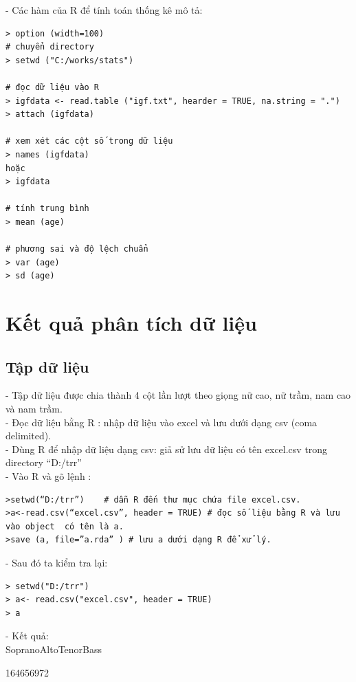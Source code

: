 \documentclass[a4paper]{article}
\begin{document}
		- Các hàm của R để tính toán thống kê mô tả:
\begin{verbatim}
> option (width=100)
# chuyển directory
> setwd ("C:/works/stats")

# đọc dữ liệu vào R
> igfdata <- read.table ("igf.txt", hearder = TRUE, na.string = ".")
> attach (igfdata)

# xem xét các cột số trong dữ liệu
> names (igfdata)
hoặc
> igfdata

# tính trung bình
> mean (age)

# phương sai và độ lệch chuẩn
> var (age)
> sd (age)
\end{verbatim}

\section{Kết quả phân tích dữ liệu}
	\subsection{Tập dữ liệu} 
- Tập dữ liệu được chia thành 4 cột lần lượt theo giọng nữ cao, nữ trầm, nam cao và nam trầm.\\
- Đọc dữ liệu bằng R : nhập dữ liệu vào excel và lưu dưới dạng csv (coma delimited).\\
- Dùng R để nhập dữ liệu dạng csv: giả sử lưu dữ liệu có tên excel.csv trong directory  “D:/trr”\\
- Vào R và gõ lệnh :
\begin{verbatim}
>setwd(“D:/trr”)	# dẫn R đến thư mục chứa file excel.csv.
>a<-read.csv(“excel.csv”, header = TRUE) # đọc số liệu bằng R và lưu vào object  có tên là a.
>save (a, file=”a.rda” ) # lưu a dưới dạng R để xử lý.
\end{verbatim}
- Sau đó ta kiểm tra lại:
\begin{verbatim}
> setwd("D:/trr")
> a<- read.csv("excel.csv", header = TRUE)
> a
\end{verbatim}
- Kết quả: \\
\hspace{1.5cm}Soprano\hspace{1.5cm}Alto\hspace{1.5cm}Tenor\hspace{1.5cm}Bass

1\hspace{1.5cm}64\hspace{1.5cm}65\hspace{1.5cm}69\hspace{1.5cm}72
\end{document}
